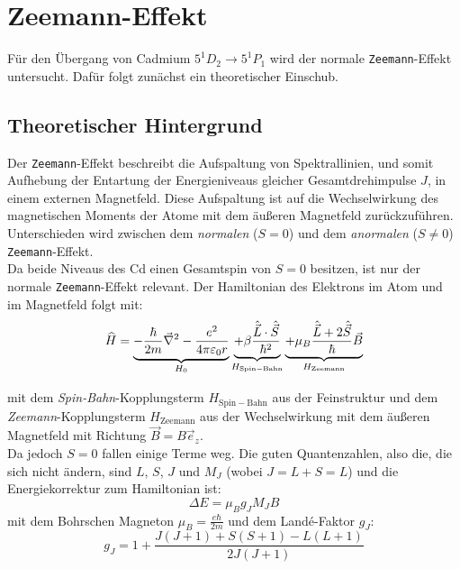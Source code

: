 \chapter{Zeemann-Effekt}
Für den Übergang von Cadmium $5^1D_2 \rightarrow 5^1P_1$ wird der normale \texttt{Zeemann}-Effekt untersucht. Dafür folgt zunächst ein theoretischer Einschub.
\section{Theoretischer Hintergrund}

Der \texttt{Zeemann}-Effekt beschreibt die Aufspaltung von Spektrallinien, und somit Aufhebung der Entartung der Energieniveaus gleicher Gesamtdrehimpulse $J$, in einem externen Magnetfeld. 
Diese Aufspaltung ist auf die Wechselwirkung des magnetischen Moments der Atome mit dem äußeren Magnetfeld zurückzuführen.
Unterschieden wird zwischen dem \textit{normalen} ($S=0$) und dem \textit{anormalen} ($S\neq 0$) \texttt{Zeemann}-Effekt.\\
Da beide Niveaus des Cd einen Gesamtspin von $S=0$ besitzen, ist nur der normale \texttt{Zeemann}-Effekt relevant.
Der Hamiltonian des Elektrons im Atom und im Magnetfeld folgt mit:
\begin{equation}
    \widehat{H}= 
    \underbrace{-\frac{\hbar}{2m}\vec{\nabla}^2 
    -\frac{e^2}{4\pi\varepsilon_0 r}}_{\raisebox{1.5ex}{\scriptsize $H_\mathrm{0}$}} 
    \underbrace{+\beta\frac{\hat{\vec{L}}\cdot\hat{\vec{S}}}{\hbar^2}}_{\raisebox{1.5ex}{\scriptsize $H_{\mathrm{Spin-Bahn}}$}}
    \underbrace{+\mu_B\frac{\hat{\vec{L}}+2\hat{\vec{S}}}{\hbar}\vec{B}}_{\raisebox{1.5ex}{\scriptsize $H_{\mathrm{Zeemann}}$}}
\end{equation}
mit dem \textit{Spin-Bahn}-Kopplungsterm $H_{\mathrm{Spin-Bahn}}$ aus der Feinstruktur und dem \textit{Zeemann}-Kopplungsterm $H_{\mathrm{Zeemann}}$ aus der 
Wechselwirkung mit dem äußeren Magnetfeld mit Richtung $\vec{B}=B\vec{e}_z$.\\
Da jedoch $S=0$ fallen einige Terme weg. Die guten Quantenzahlen, also die, die sich nicht ändern, sind $L$, $S$, $J$ und $M_J$ (wobei $J=L+S=L$) und die 
Energiekorrektur zum Hamiltonian ist:
\begin{equation}
    \Delta E = \mu_B g_J M_J B
\end{equation}
mit dem Bohrschen Magneton $\mu_B = \frac{e\hbar}{2m}$ und dem Landé-Faktor $g_J$:
\begin{equation}
    g_J = 1 + \frac{J(J+1) + S(S+1) - L(L+1)}{2J(J+1)}
\end{equation}
